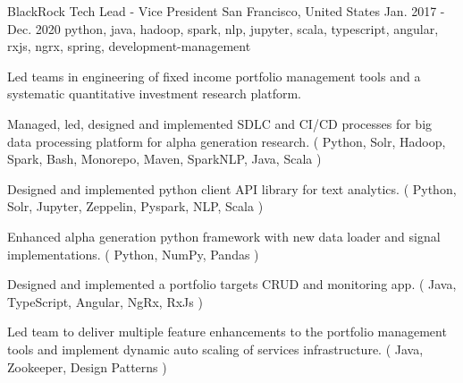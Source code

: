 \cventry
    {BlackRock} %
    {Tech Lead - Vice President} %
    {San Francisco, United States} %
    {Jan. 2017 - Dec. 2020} %
    { python, java, hadoop, spark, nlp, jupyter, scala, typescript, angular, rxjs, ngrx, spring, development-management} %
    {
        Led teams in engineering of fixed income portfolio management tools and a systematic quantitative investment research platform.
    \begin{cvitems} %
        \item { Managed, led, designed and implemented SDLC and CI/CD processes for big data processing platform for alpha generation research. ( Python, Solr, Hadoop, Spark, Bash, Monorepo, Maven, SparkNLP, Java, Scala ) }
        \item { Designed and implemented python client API library for text analytics. ( Python, Solr, Jupyter, Zeppelin, Pyspark, NLP, Scala )}
        \item { Enhanced alpha generation python framework with new data loader and signal implementations. ( Python, NumPy, Pandas )}
        \item { Designed and implemented a portfolio targets CRUD and monitoring app. ( Java, TypeScript, Angular, NgRx, RxJs ) }
        \item { Led team to deliver multiple feature enhancements to the portfolio management tools and implement dynamic auto scaling of services infrastructure. ( Java, Zookeeper, Design Patterns )}
    \end{cvitems}
    }





